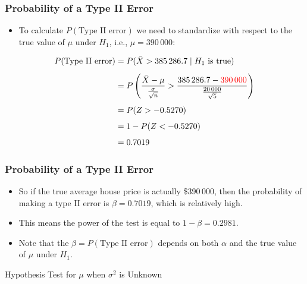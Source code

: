 \documentclass[14pt]{beamer}
\begin{document}
\begin{frame}
	\frametitle{Probability of a Type II Error}
	
	\begin{itemize}[label={\color{blue}$\blacktriangleright$}]
		\item To calculate $P(\text{Type II error})$ we need to standardize with respect to the true value of $\mu$ under $H_1$, i.e., $\mu = 390\,000$:
	\end{itemize}
	
	\begin{align*}
		P(\text{Type II error}) &= P(\bar{X} > 385\,286.7 \mid H_1 \text{ is true}) \\[1ex]
		&= P\left(\frac{\bar{X} - \mu}{\frac{\sigma}{\sqrt{n}}} > \frac{385\,286.7 - \color{red}390\,000\color{black}}{\frac{20\,000}{\sqrt{5}}}\right) \\[1ex]
		&= P(Z > -0.5270) \\[1ex]
		&= 1 - P(Z < -0.5270) \\[1ex]
		&= 0.7019
	\end{align*}
	
\end{frame}
\begin{frame}
	\frametitle{Probability of a Type II Error}
	
	\begin{itemize}[label={\color{blue}$\blacktriangleright$}]
		\item So if the true average house price is actually \$390\,000, then the probability of making a type II error is $\beta = 0.7019$, which is relatively high.
		
		\item This means the power of the test is equal to $1 - \beta = 0.2981$.
		
		\item Note that the $\beta = P(\text{Type II error})$ depends on both $\alpha$ and the true value of $\mu$ under $H_1$.
	\end{itemize}
	
\end{frame}
	\begin{frame}
	\vspace{1cm}
	\centering
	{\color{blue}\large Hypothesis Test for $\mu$ when $\sigma^2$ is Unknown}
\end{frame}
\end{document}

